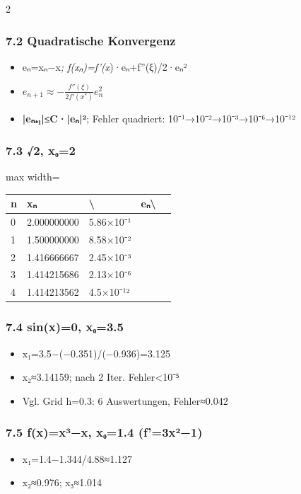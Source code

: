 \documentclass[10pt, a4paper]{article}
\begin{document}
\begin{multicols}{2}
\subsubsection{7.2 Quadratische Konvergenz}
\begin{itemize}
  \item eₙ=xₙ−x\textit{; f(xₙ)=f'(x})·eₙ+f''(ξ)/2·eₙ²
  \item $e_{n+1}\approx-\frac{f''(\xi)}{2f'(x^*)}e_n^2$
  \item \textbf{|eₙ₊₁|≤C·|eₙ|²}; Fehler quadriert: 10⁻¹→10⁻²→10⁻³→10⁻⁶→10⁻¹²
\end{itemize}


\subsubsection{7.3 √2, x₀=2}

{\small
\begin{adjustbox}{max width=\linewidth}
{\scriptsize
\begin{tabular}{lllll}
\toprule
\textbf{n} & \textbf{xₙ} & {\color{white}\textbf{\textbackslash{}}} & {\color{white}\textbf{eₙ\textbackslash{}}} & \textbf{} \\
\midrule
0 & 2.000000000 & 5.86×10⁻¹ &  &  \\
1 & 1.500000000 & 8.58×10⁻² &  &  \\
2 & 1.416666667 & 2.45×10⁻³ &  &  \\
3 & 1.414215686 & 2.13×10⁻⁶ &  &  \\
4 & 1.414213562 & 4.5×10⁻¹² &  &  \\
\bottomrule
\end{tabular}
}
\end{adjustbox}
}



\subsubsection{7.4 sin(x)=0, x₀=3.5}
\begin{itemize}
  \item x₁=3.5−(−0.351)/(−0.936)=3.125
  \item x₂≈3.14159; nach 2 Iter. Fehler<10⁻⁵
  \item Vgl. Grid h=0.3: 6 Auswertungen, Fehler≈0.042
\end{itemize}


\subsubsection{7.5 f(x)=x³−x, x₀=1.4 (f'=3x²−1)}
\begin{itemize}
  \item x₁=1.4−1.344/4.88≈1.127
  \item x₂≈0.976; x₃≈1.014
\end{itemize}



\end{multicols}
\end{document}
